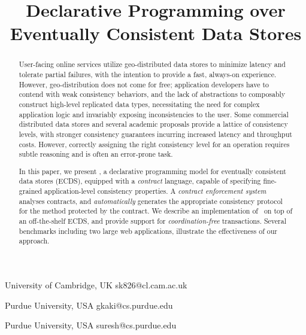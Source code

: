 \documentclass{sigplanconf}
\newcommand{\ecds}{ECDS\xspace}
\begin{document}
%
%
\title{Declarative Programming over Eventually Consistent Data Stores }

           {University of Cambridge, UK}
           {sk826@cl.cam.ac.uk}

           {Purdue University, USA}
           {gkaki@cs.purdue.edu}

           {Purdue University, USA}
           {suresh@cs.purdue.edu}


\maketitle

\begin{abstract}
User-facing online services utilize geo-distributed data stores to minimize
latency and tolerate partial failures, with the intention to provide a fast,
always-on experience. However, geo-distribution does not come for free;
application developers have to contend with weak consistency behaviors, and
the lack of abstractions to composably construct high-level replicated data
types, necessitating the need for complex application logic and invariably
exposing inconsistencies to the user. Some commercial distributed data
stores and several academic proposals provide a lattice of consistency
levels, with stronger consistency guarantees incurring increased latency and
throughput costs. However, correctly assigning the right consistency level
for an operation requires subtle reasoning and is often an error-prone task.

In this paper, we present \name, a declarative programming model for eventually
consistent data stores (\ecds), equipped with a \emph{contract} language,
capable of specifying fine-grained application-level consistency properties. A
\emph{contract enforcement system} analyses contracts, and \emph{automatically}
generates the appropriate consistency protocol for the method protected by the
contract. We describe an implementation of \name\ on top of an off-the-shelf
\ecds, and provide support for \emph{coordination-free} transactions. Several
benchmarks including two large web applications, illustrate the effectiveness
of our approach.
\end{abstract}
\end{document}
